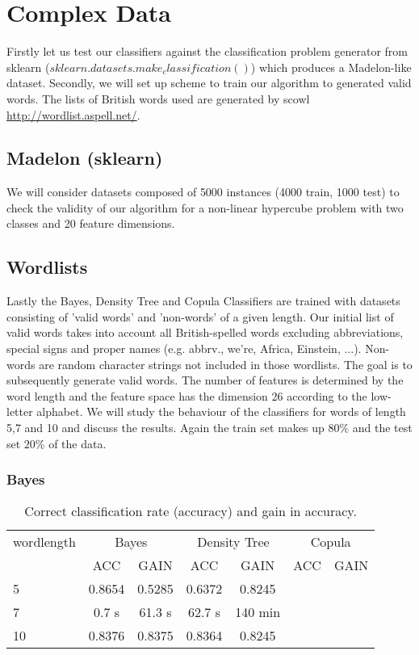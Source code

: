 \documentclass{article}
\begin{document}
\section{Complex Data}
Firstly let us test our classifiers against the classification problem generator from sklearn
($sklearn.datasets.make_classification()$) which produces a Madelon-like dataset.
Secondly, we will set up scheme to train our algorithm to generated valid words.
The lists of British words used are generated by scowl \url{http://wordlist.aspell.net/}.

\subsection{Madelon (sklearn)}
We will consider datasets composed of 5000 instances (4000 train, 1000 test) to check the validity
of our algorithm for a non-linear hypercube problem with two classes and 20 feature dimensions.

\subsection{Wordlists}
Lastly the Bayes, Density Tree and Copula Classifiers are trained with datasets consisting of 'valid words' and 'non-words'
of a given length. Our initial list of valid words takes into account all British-spelled words
excluding abbreviations, special signs and proper names (e.g. abbrv., we're, Africa, Einstein, ...).
Non-words are random character strings not included in those wordlists.
The goal is to subsequently generate valid words.
\newline
The number of features is determined by the word length
and the feature space has the dimension 26 according to the low-letter alphabet.
We will study the behaviour of the classifiers for words of length 5,7 and 10 and discuss the results.
Again the train set makes up $80\%$ and the test set $20\%$ of the data.

\subsubsection{Bayes}

\begin{table}[h]
	\centering
	\begin{tabular}{l c c c c c c }
		wordlength	& \multicolumn{2}{|c|}{Bayes} 	& \multicolumn{2}{|c|}{Density Tree}	& \multicolumn{2}{|c|}{Copula} 	\\
					& ACC		& GAIN				& ACC		& GAIN						& ACC		& GAIN				\\ \hfill
		5			&	0.8654	&	0.5285	&	0.6372		& 0.8245	\\
	 	7			&   0.7 s	&	61.3 s	&	62.7 s		& 140 min	\\
		10 			& 	0.8376	&	0.8375	&	0.8364		& 0.8245	\\
	\end{tabular}
	\caption{Correct classification rate (accuracy) and gain in accuracy.}
	\label{tab6}
\end{table}
\end{document}
